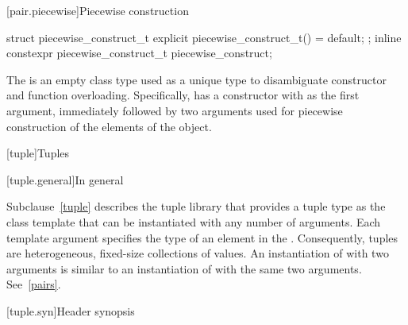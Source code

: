 [pair.piecewise]{Piecewise construction}

%
%
\begin{itemdecl}
struct piecewise_construct_t {
  explicit piecewise_construct_t() = default;
};
inline constexpr piecewise_construct_t piecewise_construct{};
\end{itemdecl}

\pnum
The   is an empty class type
used as a unique type to disambiguate constructor and function overloading. Specifically,
 has a constructor with  as the
first argument, immediately followed by two  arguments used
for piecewise construction of the elements of the  object.

[tuple]{Tuples}

[tuple.general]{In general}

\pnum
{}%
Subclause~\ref{tuple} describes the tuple library that provides a tuple type as
the class template  that can be instantiated with any number
of arguments. Each template argument specifies
the type of an element in the .  Consequently, tuples are
heterogeneous, fixed-size collections of values. An instantiation of  with
two arguments is similar to an instantiation of  with the same two arguments.
See~\ref{pairs}.

[tuple.syn]{Header  synopsis}

